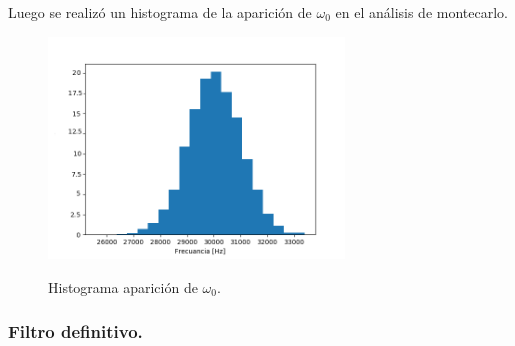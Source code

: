 Luego se realizó un histograma de la aparición de $\omega_0$ en el análisis de montecarlo.
\begin{figure}[H]
	\centering
	\includegraphics[width=0.7\textwidth]{Imagenes-Ej2/histW0.png}
	\label{fig:graph}
	\caption{Histograma aparición de $\omega_0$.}
\end{figure}

\subsubsection{Filtro definitivo.}

